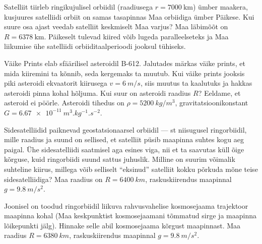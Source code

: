 \documentclass[10pt]{article}
\begin{document}
{%

Satelliit tiirleb ringikujulisel orbiidil (raadiusega $r=\SI{7000}{\kilo\metre}$) ümber maakera, kusjuures satelliidi orbiit on samas tasapinnas Maa orbiidiga ümber Päikese. Kui suure osa ajast veedab satelliit keskmiselt Maa varjus? Maa läbimõõt on $R=\SI{6378}{\kilo\metre}$. Päikeselt tulevad kiired võib lugeda paralleelseteks ja Maa liikumise ühe satelliidi orbiiditaalperioodi jooksul tühiseks.
\probend
\bigskip


Väike Prints elab sfäärilisel asteroidil B-612. Jalutades märkas väike prints, et mida kiiremini ta kõnnib, seda kergemaks ta muutub. Kui väike prints jooksis piki asteroidi ekvaatorit kiirusega $v = \SI{6}{m/s}$, siis muutus ta kaalutuks ja hakkas asteroidi pinna kohal hõljuma. Kui suur on asteroidi raadius $R$? Eeldame, et asteroid ei pöörle. Asteroidi tihedus on $\rho = \SI{5200}{kg/m^3}$, gravitatsioonikonstant $G = \SI{6.67e-11}{m^3.kg^{-1}.s^{-2}}$.
\probend
\bigskip


Sidesatelliidid paiknevad geostatsionaarsel orbiidil --- st niisugusel ringorbiidil, mille raadius ja suund on sellised, et satelliit püsib maapinna suhtes kogu aeg paigal. Ühe sidesatelliidi saatmisel aga esines viga, nii et ta saavutas küll õige kõrguse, kuid ringorbiidi suund sattus juhuslik. Milline on suurim võimalik suhteline kiirus, millega võib selliselt \enquote{eksinud} satelliit kokku põrkuda mõne teise sidesatelliidiga? Maa raadius on $R = \SI{6400}{km}$, raskuskiirendus maapinnal $g = \SI{9,8}{m/s^2}$.
\probend
\bigskip


Joonisel on toodud ringorbiidil liikuva rahvusvahelise kosmosejaama trajektoor maapinna kohal (Maa keskpunktist kosmosejaamani tõmmatud sirge ja maapinna lõikepunkti jälg). Hinnake selle abil kosmosejaama kõrgust maapinnast. Maa raadius $R = \SI{6380}{km}$, raskuskiirendus maapinnal $g = \SI{9,8}{m/s^2}$.

}
\end{document}
